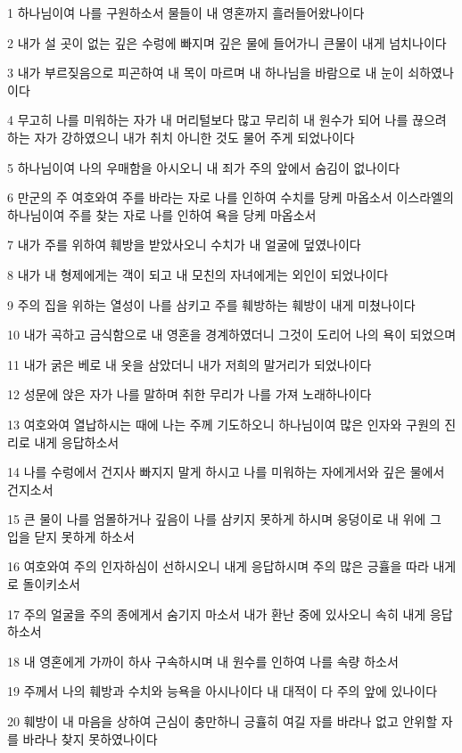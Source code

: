 \par 1 하나님이여 나를 구원하소서 물들이 내 영혼까지 흘러들어왔나이다
\par 2 내가 설 곳이 없는 깊은 수렁에 빠지며 깊은 물에 들어가니 큰물이 내게 넘치나이다
\par 3 내가 부르짖음으로 피곤하여 내 목이 마르며 내 하나님을 바람으로 내 눈이 쇠하였나이다
\par 4 무고히 나를 미워하는 자가 내 머리털보다 많고 무리히 내 원수가 되어 나를 끊으려 하는 자가 강하였으니 내가 취치 아니한 것도 물어 주게 되었나이다
\par 5 하나님이여 나의 우매함을 아시오니 내 죄가 주의 앞에서 숨김이 없나이다
\par 6 만군의 주 여호와여 주를 바라는 자로 나를 인하여 수치를 당케 마옵소서 이스라엘의 하나님이여 주를 찾는 자로 나를 인하여 욕을 당케 마옵소서
\par 7 내가 주를 위하여 훼방을 받았사오니 수치가 내 얼굴에 덮였나이다
\par 8 내가 내 형제에게는 객이 되고 내 모친의 자녀에게는 외인이 되었나이다
\par 9 주의 집을 위하는 열성이 나를 삼키고 주를 훼방하는 훼방이 내게 미쳤나이다
\par 10 내가 곡하고 금식함으로 내 영혼을 경계하였더니 그것이 도리어 나의 욕이 되었으며
\par 11 내가 굵은 베로 내 옷을 삼았더니 내가 저희의 말거리가 되었나이다
\par 12 성문에 앉은 자가 나를 말하며 취한 무리가 나를 가져 노래하나이다
\par 13 여호와여 열납하시는 때에 나는 주께 기도하오니 하나님이여 많은 인자와 구원의 진리로 내게 응답하소서
\par 14 나를 수렁에서 건지사 빠지지 말게 하시고 나를 미워하는 자에게서와 깊은 물에서 건지소서
\par 15 큰 물이 나를 엄몰하거나 깊음이 나를 삼키지 못하게 하시며 웅덩이로 내 위에 그 입을 닫지 못하게 하소서
\par 16 여호와여 주의 인자하심이 선하시오니 내게 응답하시며 주의 많은 긍휼을 따라 내게로 돌이키소서
\par 17 주의 얼굴을 주의 종에게서 숨기지 마소서 내가 환난 중에 있사오니 속히 내게 응답하소서
\par 18 내 영혼에게 가까이 하사 구속하시며 내 원수를 인하여 나를 속량 하소서
\par 19 주께서 나의 훼방과 수치와 능욕을 아시나이다 내 대적이 다 주의 앞에 있나이다
\par 20 훼방이 내 마음을 상하여 근심이 충만하니 긍휼히 여길 자를 바라나 없고 안위할 자를 바라나 찾지 못하였나이다
